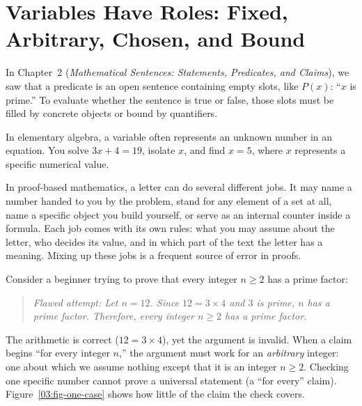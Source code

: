 \section{Variables Have Roles: Fixed, Arbitrary, Chosen, and Bound}
\chapterline

In Chapter~2 (\emph{Mathematical Sentences: Statements, Predicates, and Claims}), we saw that a predicate is an open sentence containing empty slots, like $P(x)$: ``$x$ is prime.'' To evaluate whether the sentence is true or false, those slots must be filled by concrete objects or bound by quantifiers.

In elementary algebra, a variable often represents an unknown number in an equation. You solve $3x + 4 = 19$, isolate $x$, and find $x = 5$, where $x$ represents a specific numerical value.

In proof-based mathematics, a letter can do several different jobs. It may name a number handed to you by the problem, stand for any element of a set at all, name a specific object you build yourself, or serve as an internal counter inside a formula. Each job comes with its own rules: what you may assume about the letter, who decides its value, and in which part of the text the letter has a meaning. Mixing up these jobs is a frequent source of error in proofs.

Consider a beginner trying to prove that every integer $n \ge 2$ has a prime factor:
\begin{quote}
\itshape Flawed attempt: Let $n = 12$. Since $12 = 3 \times 4$ and $3$ is prime, $n$ has a prime factor. Therefore, every integer $n \ge 2$ has a prime factor.
\end{quote}
The arithmetic is correct ($12 = 3 \times 4$), yet the argument is invalid. When a claim begins ``for every integer $n$,'' the argument must work for an \emph{arbitrary} integer: one about which we assume nothing except that it is an integer $n \ge 2$. Checking one specific number cannot prove a universal statement (a ``for every'' claim). Figure~\ref{03:fig-one-case} shows how little of the claim the check covers.

